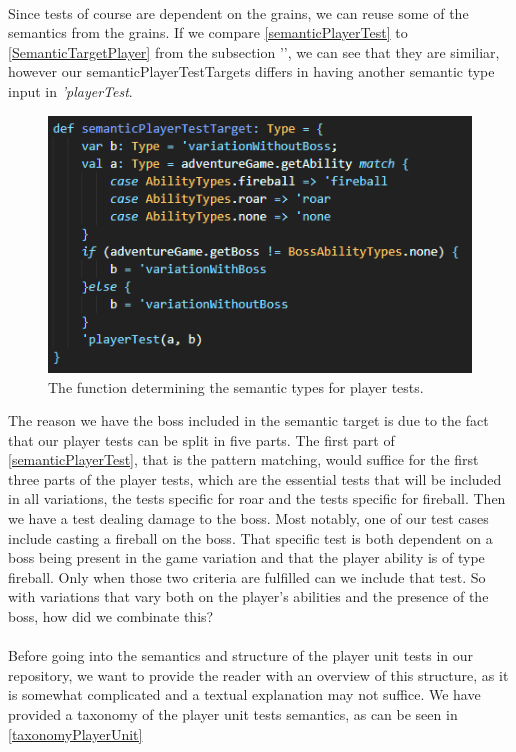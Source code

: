 \\
Since tests of course are dependent on the grains, we can reuse some of the semantics from the grains. If we compare \autoref{semanticPlayerTest} to \autoref{SemanticTargetPlayer} from the subsection '', we can see that they are similiar, however our semanticPlayerTestTargets differs in having another semantic type input in \textit{'playerTest}. 
\begin{figure}[h]
    \centering
    \includegraphics[width=0.7\linewidth]{Materials/TestingDiscussion/SemanticPlayerTestTarget}
    \caption{The function determining the semantic types for player tests.}
    \label{semanticPlayerTest}
\end{figure}
The reason we have the boss included in the semantic target is due to the fact that our player tests can be split in five parts. The first part of \autoref{semanticPlayerTest}, that is the pattern matching, would suffice for the first three parts of the player tests, which are the essential tests that will be included in all variations, the tests specific for roar and the tests specific for fireball. Then we have a test dealing damage to the boss. Most notably, one of our test cases include casting a fireball on the boss. That specific test is both dependent on a boss being present in the game variation and that the player ability is of type fireball. Only when those two criteria are fulfilled can we include that test. So with variations that vary both on the player's abilities and the presence of the boss, how did we combinate this? \\
\\
Before going into the semantics and structure of the player unit tests in our repository, we want to provide the reader with an overview of this structure, as it is somewhat complicated and a textual explanation may not suffice. We have provided a taxonomy of the player unit tests semantics, as can be seen in \autoref{taxonomyPlayerUnit}
